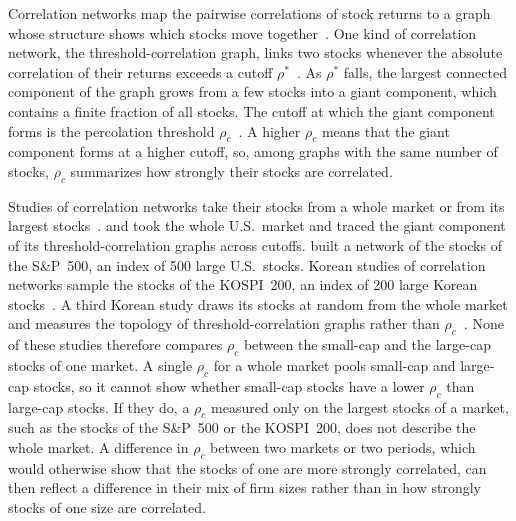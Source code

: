 \documentclass[a4paper,fleqn]{cas-sc}
\begin{document}
Correlation networks map the pairwise correlations of stock returns to a graph whose structure shows which stocks move together~\citep{mantegna1999hierarchical}. One kind of correlation network, the threshold-correlation graph, links two stocks whenever the absolute correlation of their returns exceeds a cutoff $\rho^*$~\citep{boginski2005statistical}. As $\rho^*$ falls, the largest connected component of the graph grows from a few stocks into a giant component, which contains a finite fraction of all stocks. The cutoff at which the giant component forms is the percolation threshold $\rho_c$~\citep{stauffer1994introduction}. A higher $\rho_c$ means that the giant component forms at a higher cutoff, so, among graphs with the same number of stocks, $\rho_c$ summarizes how strongly their stocks are correlated.

Studies of correlation networks take their stocks from a whole market or from its largest stocks~\citep{boginski2005statistical, tse2010network, shirazi2017noncriticality, jung2006characteristics, eom2009topological, tuhin2023network}. \citet{boginski2005statistical} and \citet{tse2010network} took the whole U.S.\ market and traced the giant component of its threshold-correlation graphs across cutoffs. \citet{shirazi2017noncriticality} built a network of the stocks of the S\&P~500, an index of 500 large U.S.\ stocks. Korean studies of correlation networks sample the stocks of the KOSPI~200, an index of 200 large Korean stocks~\citep{jung2006characteristics, eom2009topological}. A third Korean study draws its stocks at random from the whole market and measures the topology of threshold-correlation graphs rather than $\rho_c$~\citep{tuhin2023network}. None of these studies therefore compares $\rho_c$ between the small-cap and the large-cap stocks of one market. A single $\rho_c$ for a whole market pools small-cap and large-cap stocks, so it cannot show whether small-cap stocks have a lower $\rho_c$ than large-cap stocks. If they do, a $\rho_c$ measured only on the largest stocks of a market, such as the stocks of the S\&P~500 or the KOSPI~200, does not describe the whole market. A difference in $\rho_c$ between two markets or two periods, which would otherwise show that the stocks of one are more strongly correlated, can then reflect a difference in their mix of firm sizes rather than in how strongly stocks of one size are correlated.
\end{document}

